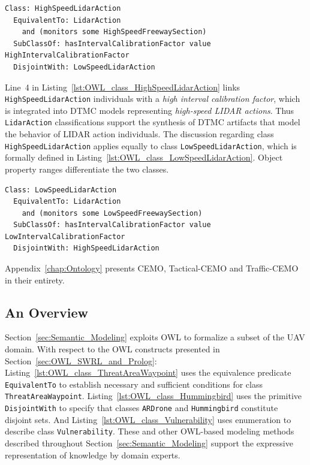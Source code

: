 \begin{lstlisting}[caption={OWL code for class \texttt{HighSpeedLidarAction}},label=lst:OWL_class_HighSpeedLidarAction]
Class: HighSpeedLidarAction
  EquivalentTo: LidarAction
    and (monitors some HighSpeedFreewaySection)
  SubClassOf: hasIntervalCalibrationFactor value HighIntervalCalibrationFactor
  DisjointWith: LowSpeedLidarAction
\end{lstlisting}

Line~4 in Listing~\ref{lst:OWL_class_HighSpeedLidarAction} links \texttt{HighSpeedLidarAction} individuals with a \emph{high interval calibration factor}, which is integrated into DTMC models representing \emph{high-speed LIDAR actions}. Thus \texttt{LidarAction} classifications support the synthesis of DTMC artifacts that model the behavior of LIDAR action individuals. The discussion regarding class \texttt{HighSpeedLidarAction} applies equally to class \texttt{LowSpeedLidarAction}, which is formally defined in Listing~\ref{lst:OWL_class_LowSpeedLidarAction}. Object property ranges differentiate the two classes.

\begin{lstlisting}[caption={OWL code for class \texttt{LowSpeedLidarAction}},label=lst:OWL_class_LowSpeedLidarAction]
Class: LowSpeedLidarAction
  EquivalentTo: LidarAction
    and (monitors some LowSpeedFreewaySection)
  SubClassOf: hasIntervalCalibrationFactor value LowIntervalCalibrationFactor
  DisjointWith: HighSpeedLidarAction
\end{lstlisting}

Appendix~\ref{chap:Ontology} presents CEMO, Tactical-CEMO and Traffic-CEMO in their entirety.

\subsection{An Overview}

Section~\ref{sec:Semantic_Modeling} exploits OWL to formalize a subset of the UAV domain. With respect to the OWL constructs presented in Section~\ref{sec:OWL_SWRL_and_Prolog}: Listing~\ref{lst:OWL_class_ThreatAreaWaypoint} uses the equivalence predicate \texttt{EquivalentTo} to establish necessary and sufficient conditions for class \texttt{ThreatArea\-Waypoint}. Listing~\ref{lst:OWL_class_Hummingbird} uses the primitive \texttt{DisjointWith} to specify that classes \texttt{ARDrone} and \texttt{Hummingbird} constitute disjoint sets. And Listing~\ref{lst:OWL_class_Vulnerability} uses enumeration to describe class \texttt{Vulnerability}. These and other OWL-based modeling methods described throughout Section~\ref{sec:Semantic_Modeling} support the expressive representation of knowledge by domain experts.


